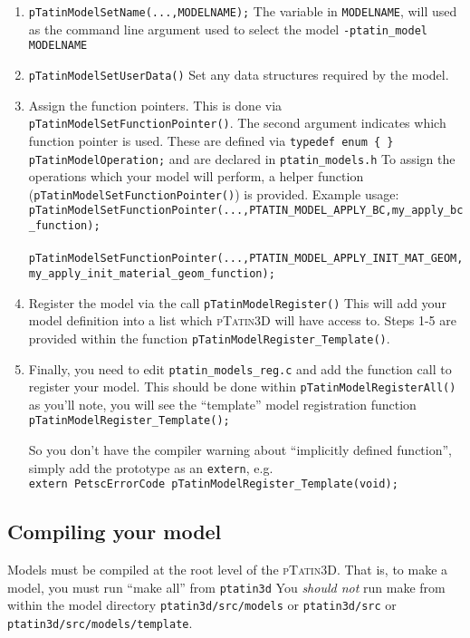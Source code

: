 \documentclass[paper=a4, fontsize=10pt,twoside]{scrartcl}
\newcommand{\ptat}{{{\textsc{pTatin3D}}}}
\newcommand{\shellcmd}[1]{\\\indent\indent\texttt{\hspace{5mm}\footnotesize #1}\\}
\newcommand{\unix}[1]{\texttt{\footnotesize #1}}
\begin{document}
{{\begin{enumerate}
	\item \unix{pTatinModelSetName(...,MODELNAME);}
The variable in \unix{MODELNAME}, will used as the command line argument used to select the model
	\unix{-ptatin\_model MODELNAME}

	\item \unix{pTatinModelSetUserData()}
Set any data structures required by the model.

	\item Assign the function pointers. This is done via \unix{pTatinModelSetFunctionPointer()}.
The second argument indicates which function pointer is used. These are defined via
\unix{typedef enum \{ \} pTatinModelOperation;}
and are declared in
\unix{ptatin\_models.h}
To assign the operations which your model will perform, a helper function (\unix{pTatinModelSetFunctionPointer()}) is provided.
Example usage:
\shellcmd{pTatinModelSetFunctionPointer(...,PTATIN\_MODEL\_APPLY\_BC,my\_apply\_bc\_function);}
\shellcmd{pTatinModelSetFunctionPointer(...,PTATIN\_MODEL\_APPLY\_INIT\_MAT\_GEOM,my\_apply\_init\_material\_geom\_function);} %

	\item Register the model via the call
\unix{pTatinModelRegister()}
This will add your model definition into a list which {\ptat} will have access to.
Steps 1-5 are provided within the function \unix{pTatinModelRegister\_Template()}.

	\item Finally, you need to edit
	\unix{ptatin\_models\_reg.c}
and add the function call to register your model.
This should be done within
		\unix{pTatinModelRegisterAll()}
as you'll note, you will see the ``template'' model registration function
		\unix{pTatinModelRegister\_Template();}

So you don't have the compiler warning about ``implicitly defined function'', simply add the prototype as an \unix{extern}, e.g.
	\shellcmd{extern PetscErrorCode pTatinModelRegister\_Template(void);}
\end{enumerate}

\subsection{Compiling your model}
Models must be compiled at the root level of the {\ptat}.
That is, to make a model, you must run ``make all'' from
	\unix{ptatin3d}
You \textit{should not} run make from within the model directory
	\unix{ptatin3d/src/models}
or
	\unix{ptatin3d/src}
or
	\unix{ptatin3d/src/models/template}.

}}
\end{document}
